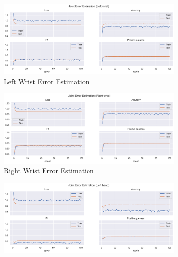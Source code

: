 \begin{figure}[!ht]
  \centering
  \begin{subfigure}[b]{0.47\linewidth}
      \centering
      \includegraphics[width=\textwidth]{figures/Results/v1_bs_60_is_64_e_100/jt/Left wrist_ErrorEstimation.png}
      \caption{Left Wrist Error Estimation}
      \label{fig:v1_lewr_jt_ee}
  \end{subfigure}
  \hfill
  \begin{subfigure}[b]{0.47\linewidth}
      \centering
      \includegraphics[width=\textwidth]{figures/Results/v1_bs_60_is_64_e_100/jt/Right wrist_ErrorEstimation.png}
      \caption{Right Wrist Error Estimation}
      \label{fig:v1_riwr_jt_ee}
  \end{subfigure}
  \hfill
  \begin{subfigure}[b]{0.47\linewidth}
      \centering
      \includegraphics[width=\textwidth]{figures/Results/v1_bs_60_is_64_e_100/jt/Left hand_ErrorEstimation.png}

\end{subfigure}
\end{figure}
